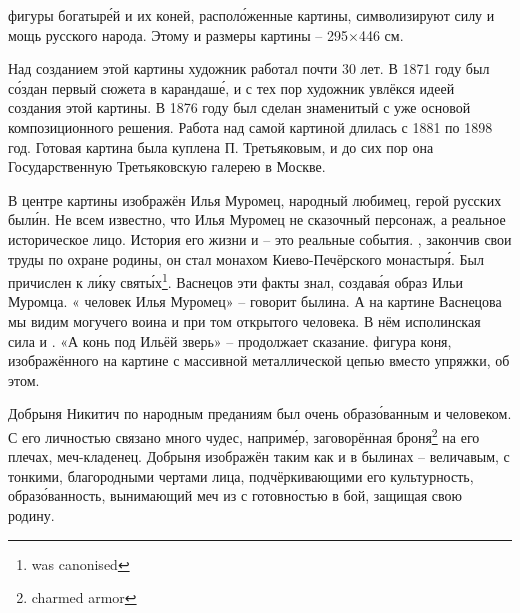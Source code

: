  фигуры богатыр\'{е}й и их коней, распол\'{о}женные  картины, символизируют силу и мощь русского народа. Этому   и  размеры картины -- 295$\times$446 см.

Над созданием этой картины художник работал почти 30 лет. В 1871 году был с\'{о}здан первый  сюжета в карандаш\'{е}, и с тех пор художник увлёкся идеей создания этой картины. В 1876 году был сделан знаменитый  с уже  основой композиционного решения. Работа над самой картиной длилась с 1881 по 1898 год. Готовая картина была куплена П. Третьяковым, и до сих пор она  Государственную Третьяковскую галерею в Москве.


В центре картины изображён Илья Муромец, народный любимец, герой русских был\'{и}н. Не всем известно, что Илья Муромец не сказочный персонаж, а реальное историческое лицо. История его жизни и   -- это реальные события. , закончив свои труды по охране родины, он стал монахом Киево-Печёрского монастыр\'{я}. Был причислен к л\'{и}ку свят\'{ы}х\footnote{was canonised}. Васнецов эти факты знал, создав\'{а}я образ Ильи Муромца. « человек Илья Муромец» -- говорит былина. А на картине Васнецова мы видим могучего воина и при том  открытого человека. В нём  исполинская сила и . «А конь под Ильёй  зверь» -- продолжает сказание.  фигура коня, изображённого на картине с массивной металлической цепью вместо упряжки,  об этом.

Добрыня Никитич по народным преданиям был очень образ\'{о}ванным и  человеком. С его личностью связано много чудес, наприм\'{е}р, заговорённая броня\footnote{charmed armor} на его плечах,  меч-кладенец. Добрыня изображён таким как и в былинах -- величавым, с тонкими, благородными чертами лица, подчёркивающими его культурность, образ\'{о}ванность,  вынимающий меч из  с готовностью  в бой, защищая свою родину.

